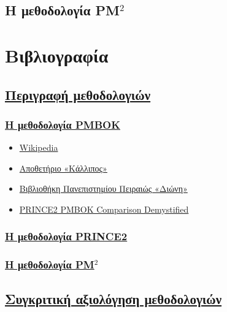 \documentclass[12pt]{turabian-researchpaper}
\begin{document}
\subsection{Η μεθοδολογία PM\texorpdfstring{$^2$}{}}\label{comparison_pm2}

\newpage\section{Βιβλιογραφία}
\subsection{\texorpdfstring{\hyperref[methods]{Περιγραφή μεθοδολογιών}}{}}
\subsubsection{\texorpdfstring{\hyperref[method_pmbok]{Η μεθοδολογία PMBOK}}{}}

\begin{itemize}[itemsep=0pt]
    \item \href{https://en.wikipedia.org/wiki/Project_Management_Body_of_Knowledge}{Wikipedia}
    \item \href{https://repository.kallipos.gr/bitstream/11419/2262/3/06_kefalaio6.pdf}{Αποθετήριο «Κάλλιπος»}
    \item \href{https://dione.lib.unipi.gr/xmlui/bitstream/handle/unipi/8488/Fragkos_Georgios.pdf}{Βιβλιοθήκη Πανεπιστημίου Πειραιώς «Διώνη»}
    \item \href{https://www.slideshare.net/CTESolutions/prince2-pmbok-comparison-demystified-29846454}{PRINCE2 PMBOK Comparison Demystified}
\end{itemize}

\subsubsection{\texorpdfstring{\hyperref[method_prince2]{Η μεθοδολογία PRINCE2}}{}}

\subsubsection{\texorpdfstring{\hyperref[method_pm2]{Η μεθοδολογία PM$^2$}}{}}

\subsection{\texorpdfstring{\hyperref[comparisons]{Συγκριτική αξιολόγηση μεθοδολογιών}}{}}
\end{document}
